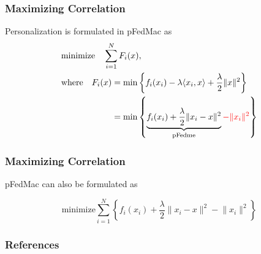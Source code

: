 
\begin{frame}
\frametitle{Maximizing Correlation}

Personalization is formulated in pFedMac \cite{li2021pfedmac} as
\begin{align*}
    & \text{minimize} \quad \sum\limits_{i=1}^N F_i(x), \\
    & \text{where} \quad F_i(x) = \min \left\{ f_i(x_i) - \lambda \langle x_i, x \rangle  + \dfrac{\lambda}{2} \lVert x \rVert^2 \right\} \\
    & \phantom{\text{where} \quad F_i(x)} = \min \left\{ \underbrace{f_i(x_i) + \dfrac{\lambda}{2} \lVert x_i - x \rVert^2}_{\text{pFedme}} {\color{red}- \lVert x_i \rVert^2} \right\}
\end{align*}


\end{frame}


\begin{frame}
\frametitle{Maximizing Correlation}

pFedMac can also be formulated as

$$\text{minimize} \sum\limits_{i=1}^N \left\{ f_i(x_i) + \dfrac{\lambda}{2} \lVert x_i - x \rVert^2 - \lVert x_i \rVert^2 \right\}$$

\end{frame}


\begin{frame}[allowframebreaks]
\frametitle{References}

{\footnotesize


}

\end{frame}



